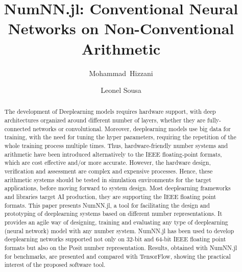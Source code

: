 \documentclass[runningheads]{llncs}
\title{NumNN.jl: Conventional Neural Networks on Non-Conventional Arithmetic}
\author{%
	Mohammad~Hizzani%
	\inst{1}%
	\and
	Leonel Sousa%
	\inst{1}%
}
\institute{Universidade de Lisboa Instituto Superior Técnico, Lisboa, Lisboa, PT
\email{moh.hizzani@gmail.com}%
\\
\email{las@inesc-id.pt}}
\begin{document}
	\maketitle

	\begin{abstract}
		The development of Deeplearning models requires hardware support, with deep architectures organized around different number of layers, whether they are fully-connected networks or convolutional. Moreover, deeplearning models use big data for training, with the need for tuning the hyper parameters, requiring the repetition of the whole training process multiple times. Thus, hardware-friendly number systems and arithmetic have been introduced alternatively to the IEEE floating-point formats, which are cost effective and/or more accurate. However, the hardware design, verification and assessment are complex and expensive processes. Hence, these arithmetic systems should be tested in simulation environments for the target applications, before moving forward to system design. Most deeplearning frameworks and libraries target AI production, they are supporting the IEEE floating point formats. This paper presents NumNN.jl, a tool for facilitating the design and prototyping of deeplearning systems based on different number representations. It provides an agile way of designing, training and evaluating any type of deeplearning (neural network) model with any number system. NumNN.jl has been used to develop deeplearning networks supported not only on 32-bit and 64-bit IEEE floating point formats but also on the Posit number representation.  Results, obtained with NumNN.jl for benchmarks, are presented and compared with TensorFlow, showing the practical interest of the proposed software tool.
	\end{abstract}

	
	
	
	
	
%	
	
	
	
\end{document}
